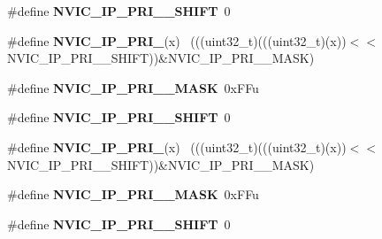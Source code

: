 \begin{DoxyCompactItemize}
\item 
\hypertarget{group___n_v_i_c___register___masks_gaef770ca3c368b767bc1210e8363ff0f7}{}\#define {\bfseries N\+V\+I\+C\+\_\+\+I\+P\+\_\+\+P\+R\+I\+\_\+\_\+\+S\+H\+I\+F\+T}~0\label{group___n_v_i_c___register___masks_gaef770ca3c368b767bc1210e8363ff0f7}

\item 
\hypertarget{group___n_v_i_c___register___masks_ga1af16c2c53f21d0223282b3809c1c808}{}\#define {\bfseries N\+V\+I\+C\+\_\+\+I\+P\+\_\+\+P\+R\+I\+\_}(x)                                              ~(((uint32\+\_\+t)(((uint32\+\_\+t)(x))$<$$<$N\+V\+I\+C\+\_\+\+I\+P\+\_\+\+P\+R\+I\+\_\+\_\+\+S\+H\+I\+F\+T))\&N\+V\+I\+C\+\_\+\+I\+P\+\_\+\+P\+R\+I\+\_\+\_\+\+M\+A\+S\+K)\label{group___n_v_i_c___register___masks_ga1af16c2c53f21d0223282b3809c1c808}

\item 
\hypertarget{group___n_v_i_c___register___masks_gaf2a6877536fd82000d2715df7092b410}{}\#define {\bfseries N\+V\+I\+C\+\_\+\+I\+P\+\_\+\+P\+R\+I\+\_\+\_\+\+M\+A\+S\+K}~0x\+F\+Fu\label{group___n_v_i_c___register___masks_gaf2a6877536fd82000d2715df7092b410}

\item 
\hypertarget{group___n_v_i_c___register___masks_ga0c17fc2a8ba9c9a060fa8633ce2d58ce}{}\#define {\bfseries N\+V\+I\+C\+\_\+\+I\+P\+\_\+\+P\+R\+I\+\_\+\_\+\+S\+H\+I\+F\+T}~0\label{group___n_v_i_c___register___masks_ga0c17fc2a8ba9c9a060fa8633ce2d58ce}

\item 
\hypertarget{group___n_v_i_c___register___masks_ga1f1f5eb61a943b981e9df609b627f2c0}{}\#define {\bfseries N\+V\+I\+C\+\_\+\+I\+P\+\_\+\+P\+R\+I\+\_}(x)                                            ~(((uint32\+\_\+t)(((uint32\+\_\+t)(x))$<$$<$N\+V\+I\+C\+\_\+\+I\+P\+\_\+\+P\+R\+I\+\_\+\_\+\+S\+H\+I\+F\+T))\&N\+V\+I\+C\+\_\+\+I\+P\+\_\+\+P\+R\+I\+\_\+\_\+\+M\+A\+S\+K)\label{group___n_v_i_c___register___masks_ga1f1f5eb61a943b981e9df609b627f2c0}

\item 
\hypertarget{group___n_v_i_c___register___masks_gaf800b7cfd31d334c41925283abeeaeb6}{}\#define {\bfseries N\+V\+I\+C\+\_\+\+I\+P\+\_\+\+P\+R\+I\+\_\+\_\+\+M\+A\+S\+K}~0x\+F\+Fu\label{group___n_v_i_c___register___masks_gaf800b7cfd31d334c41925283abeeaeb6}

\item 
\hypertarget{group___n_v_i_c___register___masks_ga82be7fed090f8f1ab5a01f2fdfd334b4}{}\#define {\bfseries N\+V\+I\+C\+\_\+\+I\+P\+\_\+\+P\+R\+I\+\_\+\_\+\+S\+H\+I\+F\+T}~0\label{group___n_v_i_c___register___masks_ga82be7fed090f8f1ab5a01f2fdfd334b4}


\end{DoxyCompactItemize}
